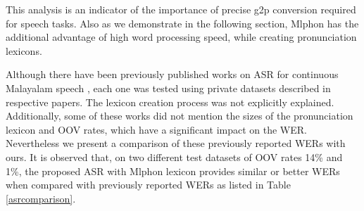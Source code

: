 \documentclass{ieeeaccess}
\begin{document}


This analysis is an indicator of the importance of precise g2p conversion required for speech tasks. Also as we demonstrate in the following section, Mlphon has the additional advantage of high word processing speed, while creating pronunciation lexicons.

Although there have been previously published works on ASR for continuous Malayalam speech \cite{lavanya2018,deekshitha,lekshmi2021}, each one was tested using private datasets described in respective papers. The lexicon creation process was not explicitly explained. Additionally, some of these works did not mention the sizes of the pronunciation lexicon and OOV rates, which have a significant impact on the WER. Nevertheless we present a comparison of these previously reported WERs with ours. It is observed that, on two different test datasets of OOV rates 14\% and 1\%, the proposed ASR with Mlphon lexicon provides similar or better WERs when compared with previously reported WERs as listed in Table \ref{asrcomparison}. 
\end{document}

